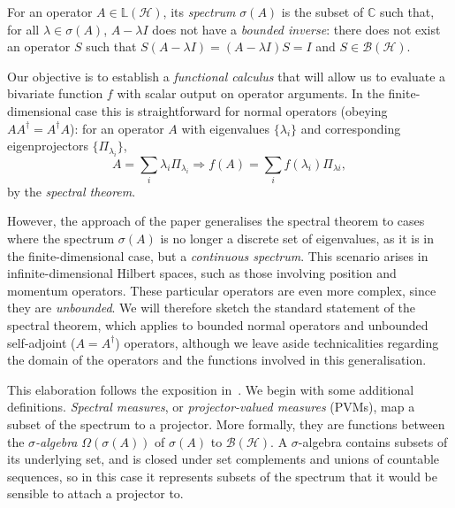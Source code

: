 \documentclass[10pt, a4paper]{article}
\numberwithin{equation}{section} %
\theoremstyle{definition}
\theoremstyle{plain}
\newcommand{\?}{\mathrel{?}} %
\newcommand{\C}{\mathbb{C}} %
\newcommand{\Lin}[1]{\mathbb{L}\left(#1\right)}
\newcommand{\Hs}{\mathcal{H}} %
\begin{document}
\begin{appendices}
                    For an operator \(A \in \Lin{\Hs}\), its \emph{spectrum} \(\sigma(A)\) is the subset of \(\C\) such that, for all \(\lambda \in \sigma(A)\), \(A - \lambda I\) does not have a \emph{bounded inverse}: there does not exist an operator \(S\) such that \(S\left( A - \lambda I \right) = \left( A - \lambda I \right)S =  I\) and \(S \in \mathcal{B}(\Hs)\).

                    Our objective is to establish a \emph{functional calculus} that will allow us to evaluate a bivariate function  \(f\) with scalar output on operator arguments. In the finite-dimensional case this is straightforward for normal operators (obeying \(AA^{\dagger} = A^{\dagger}A\)): for an operator \(A\) with eigenvalues \(\{\lambda_i\}\) and corresponding eigenprojectors \(\{\Pi_{\lambda_i}\}\),
                    \[ A = \sum_i \lambda_i \Pi_{\lambda_i} \Rightarrow f(A) = \sum_i f(\lambda_{i}) \Pi_{\lambda{i}}, \]
                    by the \emph{spectral theorem}.

                    However, the approach of the paper generalises the spectral theorem to cases where the spectrum \(\sigma(A)\) is no longer a discrete set of eigenvalues, as it is in the finite-dimensional case, but a \emph{continuous spectrum}. This scenario arises in infinite-dimensional Hilbert spaces, such as those involving position and momentum operators. These particular operators are even more complex, since they are \emph{unbounded}. We will therefore sketch the standard statement of the spectral theorem, which applies to bounded normal operators and unbounded self-adjoint (\(A = A^{\dagger}\)) operators, although we leave aside technicalities regarding the domain of the operators and the functions involved in this generalisation.

                    This elaboration follows the exposition in~\cite{HallQuantumForMath}. We begin with some additional definitions. \emph{Spectral measures}, or \emph{projector-valued measures} (PVMs), map a subset of the spectrum to a projector. More formally, they are functions between the \emph{\(\sigma\)-algebra} \(\Omega(\sigma(A))\) of \(\sigma(A)\) to \(\mathcal{B}(\Hs)\). A \(\sigma\)-algebra contains subsets of its underlying set, and is closed under set complements and unions of countable sequences, so in this case it represents subsets of the spectrum that it would be sensible to attach a projector to.


\end{appendices}
\end{document}
